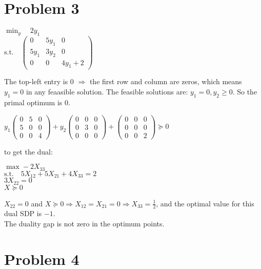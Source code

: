 \documentclass{article}
\begin{document}
\section{Problem 3}
\begin{center}
$\displaystyle \min_{y} \quad 2y_1$\\
$\text{s.t.} \quad \begin{pmatrix}
0 & 5y_1& 0 \\ 
5y_1 & 3y_2 & 0 \\ 
0 & 0 & 4y_1+2 
\end{pmatrix}$\\
\vspace{5mm} %
\end{center}
The top-left entry is 0 $\Rightarrow$ the first row and column are zeros, which
means $y_1 = 0$ in any feaasible solution.  The feasible solutions are: $y_1 = 0, y_2 \geq 0$. So the primal optimum is 0.  
\vspace{5mm}
\begin{center}
$y_1  \begin{pmatrix}
0 & 5 & 0 \\ 
5 & 0 & 0 \\ 
0 & 0 & 4 
\end{pmatrix} +
y_2  \begin{pmatrix}
0 & 0 & 0 \\ 
0 & 3 & 0 \\ 
0 & 0 & 0 
\end{pmatrix}+ \begin{pmatrix}
0 & 0 & 0 \\ 
0 & 0 & 0 \\ 
0 & 0 & 2 
\end{pmatrix}\succeq 0$
\end{center}
to get the dual:
\begin{center}
$\max -2X_{33}$\\
$\text{s.t.}\quad 5X_{12}+5X_{21}+4X_{33}=2$\\
$3X_{22}=0$\\
$X\succeq 0$
\end{center}
$X_{22}=0$  and $X\succeq 0 \Rightarrow X_{12}=X_{21}=0 \Rightarrow X_{33}=\frac{1}{2}$,  and  the optimal  value  for  this  dual  SDP  is $-1.$\\
The duality gap is not zero in the optimum points.


\section{Problem 4}
\end{document}
